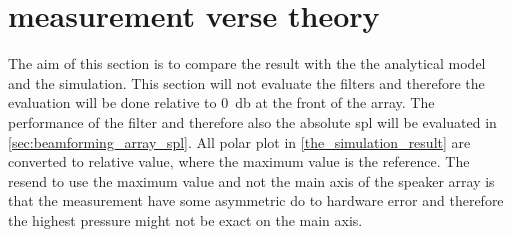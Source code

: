 \section{measurement verse theory}

The aim of this section is to compare the result with the the analytical model and the simulation. This section will not evaluate the filters and therefore the evaluation will be done relative to \SI{0}{\decibel} at the front of the array. The performance of the filter and therefore also the absolute \gls{spl} will be evaluated in \autoref{sec:beamforming_array_spl}. All polar plot in \autoref{the_simulation_result} are converted to relative value, where the maximum value is the reference. The resend to use the maximum value and not the main axis of the speaker array is that the measurement have some asymmetric do to hardware error and therefore the highest pressure might not be exact on the main axis.